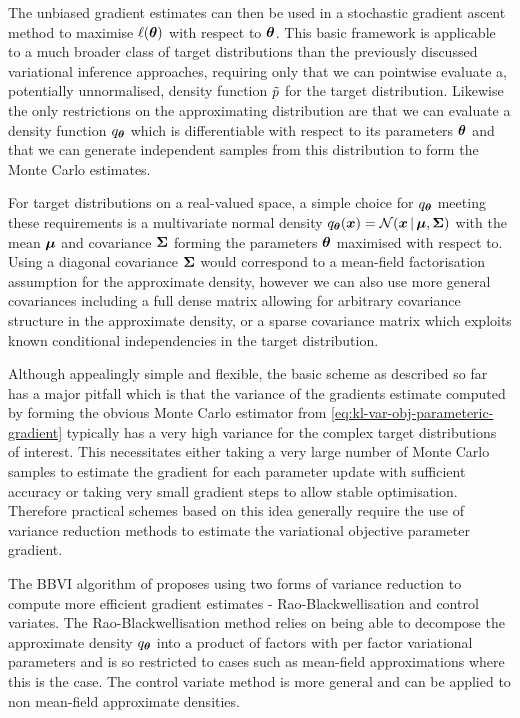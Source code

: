 The unbiased gradient estimates can then be used in a stochastic gradient ascent method \citep{robbins1951stochastic} to maximise $\ell(\boldsymbol{\theta})$ with respect to $\boldsymbol{\theta}$. This basic framework is applicable to a much broader class of target distributions than the previously discussed variational inference approaches, requiring only that we can pointwise evaluate a, potentially unnormalised, density function $\tilde{p}$ for the target distribution. Likewise the only restrictions on the approximating distribution are that we can evaluate a density function $q_{\boldsymbol{\theta}}$ which is differentiable with respect to its parameters $\boldsymbol{\theta}$ and that we can generate independent samples from this distribution to form the Monte Carlo estimates. 

For target distributions on a real-valued space, a simple choice for $q_{\boldsymbol{\theta}}$ meeting these requirements is a multivariate normal density $q_{\vct{\theta}}(\vct{x}) = \nrm{\vct{x}\gvn\vct{\mu},\mtx{\Sigma}}$ with the mean $\boldsymbol{\mu}$ and covariance $\boldsymbol{\Sigma}$ forming the parameters $\boldsymbol{\theta}$ maximised with respect to. Using a diagonal covariance $\boldsymbol{\Sigma}$ would correspond to a mean-field factorisation assumption for the approximate density, however we can also use more general covariances including a full dense matrix allowing for arbitrary covariance structure in the approximate density, or a sparse covariance matrix which exploits known conditional independencies in the target distribution.

Although appealingly simple and flexible, the basic scheme as described so far has a major pitfall which is that the variance of the gradients estimate computed by forming the obvious Monte Carlo estimator from \eqref{eq:kl-var-obj-parameteric-gradient} typically has a very high variance for the complex target distributions of interest. This necessitates either taking a very large number of Monte Carlo samples to estimate the gradient for each parameter update with sufficient accuracy or taking very small gradient steps to allow stable optimisation. Therefore practical schemes based on this idea generally require the use of variance reduction methods to estimate the variational objective parameter gradient.

The \ac{BBVI} algorithm of \citep{ranganath2014black} proposes using two forms of variance reduction to compute more efficient gradient estimates - Rao-Blackwell\-isation and control variates. The Rao-Black\-well\-isation method relies on being able to decompose the approximate density $q_{\boldsymbol{\theta}}$ into a product of factors with per factor variational parameters and is so restricted to cases such as mean-field approximations where this is the case. The control variate method is more general and can be applied to non mean-field approximate densities.

